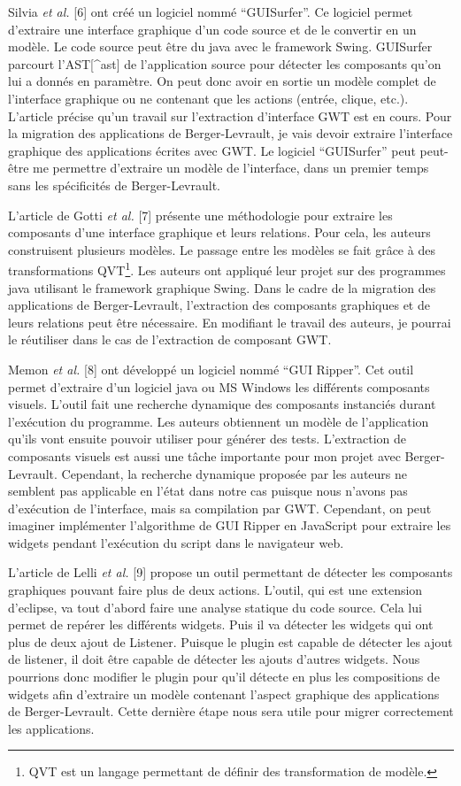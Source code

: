 \documentclass[11pt,]{article}
\begin{document}
Silvia \emph{et al.} {[}6{]} ont créé un logiciel nommé ``GUISurfer''.
Ce logiciel permet d'extraire une interface graphique d'un code source
et de le convertir en un modèle. Le code source peut être du java avec
le framework Swing. GUISurfer parcourt l'AST{[}\^{}ast{]} de
l'application source pour détecter les composants qu'on lui a donnés en
paramètre. On peut donc avoir en sortie un modèle complet de l'interface
graphique ou ne contenant que les actions (entrée, clique, etc.).
L'article précise qu'un travail sur l'extraction d'interface GWT est en
cours. Pour la migration des applications de Berger-Levrault, je vais
devoir extraire l'interface graphique des applications écrites avec GWT.
Le logiciel ``GUISurfer'' peut peut-être me permettre d'extraire un
modèle de l'interface, dans un premier temps sans les spécificités de
Berger-Levrault.

L'article de Gotti \emph{et al.} {[}7{]} présente une méthodologie pour
extraire les composants d'une interface graphique et leurs relations.
Pour cela, les auteurs construisent plusieurs modèles. Le passage entre
les modèles se fait grâce à des transformations QVT\footnote{QVT est un
  langage permettant de définir des transformation de modèle.}. Les
auteurs ont appliqué leur projet sur des programmes java utilisant le
framework graphique Swing. Dans le cadre de la migration des
applications de Berger-Levrault, l'extraction des composants graphiques
et de leurs relations peut être nécessaire. En modifiant le travail des
auteurs, je pourrai le réutiliser dans le cas de l'extraction de
composant GWT.

Memon \emph{et al.} {[}8{]} ont développé un logiciel nommé ``GUI
Ripper''. Cet outil permet d'extraire d'un logiciel java ou MS Windows
les différents composants visuels. L'outil fait une recherche dynamique
des composants instanciés durant l'exécution du programme. Les auteurs
obtiennent un modèle de l'application qu'ils vont ensuite pouvoir
utiliser pour générer des tests. L'extraction de composants visuels est
aussi une tâche importante pour mon projet avec Berger-Levrault.
Cependant, la recherche dynamique proposée par les auteurs ne semblent
pas applicable en l'état dans notre cas puisque nous n'avons pas
d'exécution de l'interface, mais sa compilation par GWT. Cependant, on
peut imaginer implémenter l'algorithme de GUI Ripper en JavaScript pour
extraire les widgets pendant l'exécution du script dans le navigateur
web.

L'article de Lelli \emph{et al.} {[}9{]} propose un outil permettant de
détecter les composants graphiques pouvant faire plus de deux actions.
L'outil, qui est une extension d'eclipse, va tout d'abord faire une
analyse statique du code source. Cela lui permet de repérer les
différents widgets. Puis il va détecter les widgets qui ont plus de deux
ajout de Listener. Puisque le plugin est capable de détecter les ajout
de listener, il doit être capable de détecter les ajouts d'autres
widgets. Nous pourrions donc modifier le plugin pour qu'il détecte en
plus les compositions de widgets afin d'extraire un modèle contenant
l'aspect graphique des applications de Berger-Levrault. Cette dernière
étape nous sera utile pour migrer correctement les applications.
\end{document}

